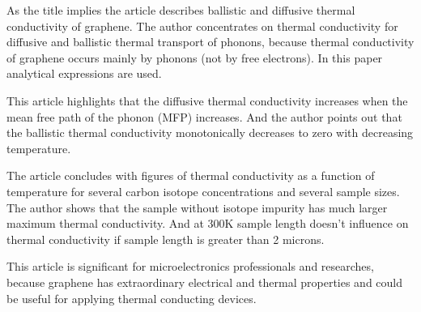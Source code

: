 \documentclass[main.tex]{subfiles}
\begin{document}
\setcounter{subsection}{7}
As the title implies the article describes ballistic and diffusive thermal conductivity of graphene.
The author concentrates on thermal conductivity for diffusive and ballistic thermal transport of phonons, because thermal conductivity of graphene occurs mainly by phonons (not by free electrons).
In this paper analytical expressions are used.\par
This article highlights that the diffusive thermal conductivity increases when the mean free path of the phonon (MFP) increases.
And the author points out that the ballistic thermal conductivity monotonically decreases to zero with decreasing temperature.\par
The article concludes with figures of thermal conductivity as a function of temperature for several carbon isotope concentrations and several sample sizes.
The author shows that the sample without isotope impurity has much larger maximum thermal conductivity.
And at 300K sample length doesn't influence on thermal conductivity if sample length is greater than 2 microns.\par
This article is significant for microelectronics professionals and researches, because graphene has extraordinary electrical and thermal properties and could be useful for applying thermal conducting devices.
\ \\\\
\newpage
\end{document}
